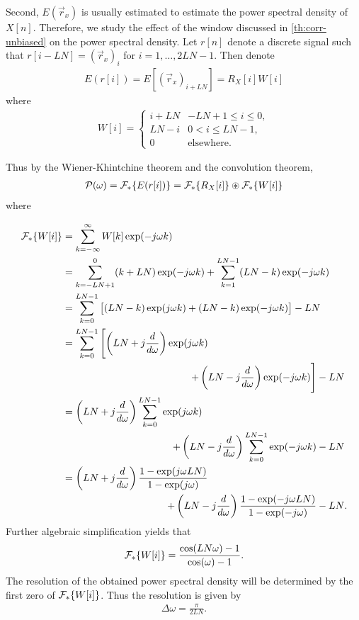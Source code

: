 \documentclass[a4paper, openany, oneside]{memoir}
\begin{document}
Second, $E(\vec{r}_x)$ is usually estimated to estimate the power spectral density of $X[n]$. Therefore, we study the effect of the window discussed in \cref{th:corr-unbiased} on the power spectral density. Let $r[n]$ denote a discrete signal such that $r[i - LN] = (\vec{r}_x)_i$ for $i = 1,\ldots,2LN-1$. Then denote
\begin{align*}
    E(r[i])=E[(\vec{r}_x)_{i + LN}]=R_X[i] W[i]
\end{align*}
where
\begin{align*}
    W[i] = \begin{cases}
        i+LN  & -LN+1 \le i \le 0, \\
        LN-i& 0 < i \le LN-1, \\
        0 & \text{elsewhere.}
    \end{cases}
\end{align*}

Thus by the Wiener-Khintchine theorem and the convolution theorem,
\begin{align*}
    \mathcal{P}(\omega)=\mathcal{F}_*\{E(r[i])\} = \mathcal{F}_*\{R_X[i]\} \circledast \mathcal{F}_*\{W[i]\}
\end{align*}
where

\renewcommand{\pushrightwidth}{10cm}
\begin{align*}
    \DTFT\{W[i]\} &= \sum_{k=-\infty}^{\infty}W[k]\exp(-j \omega k) \\
    &= \sum_{k=-LN+1}^{0}(k +LN)\exp(-j \omega k) + \sum_{k=1}^{LN-1}(LN-k) \exp(-j \omega k) \\
    &= \sum_{k=0}^{LN-1} \left[(LN-k) \exp(j \omega k) + (LN-k) \exp(-j \omega k) \right] - LN \\
    &= \sum_{k=0}^{LN-1} \left[\left(LN+j\frac{d}{d \omega}\right) \exp(j \omega k) \right.
    \\& \pushright{\left. + \left(LN-j \frac{d}{d \omega}\right) \exp(-j \omega k) \right] - LN} \\
    &= \left(LN+j\frac{d}{d \omega}\right) \sum_{k=0}^{LN-1}\exp(j \omega k)
    \\& \pushright{+ \left(LN-j \frac{d}{d \omega}\right) \sum_{k=0}^{LN-1} \exp(-j \omega k) - LN} \\
    &= \left(LN+j\frac{d}{d \omega}\right) \frac{1-\exp(j \omega LN)}{1-\exp(j \omega)}
    \\& \pushright{+ \left(LN-j \frac{d}{d \omega}\right) \frac{1-\exp(-j \omega LN)}{1-\exp(-j \omega)} - LN}.
\end{align*}
Further algebraic simplification yields that
\begin{align*}
    \mathcal{F}_*\{W[i]\} = \frac{\cos(LN \omega) - 1}{\cos(\omega) - 1}.
\end{align*}
The resolution of the obtained power spectral density will be determined by the first zero of $\mathcal{F}_*\{W[i]\}$. Thus the resolution is given by
\begin{align*}
    \Delta \omega = \frac{\pi}{2LN}.
\end{align*}
\end{document}
